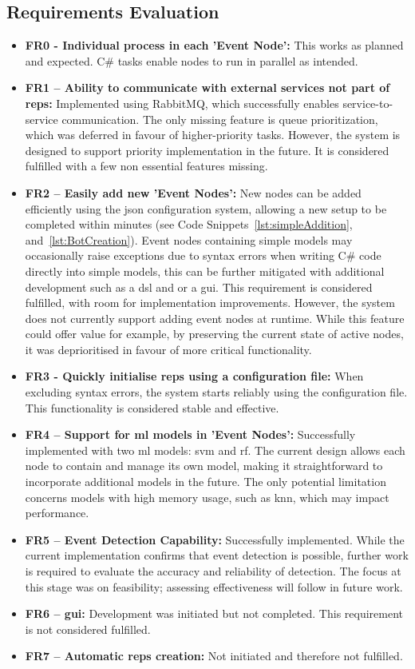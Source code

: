 \documentclass[a4paper,8pt]{article}
\begin{document}
		\subsection{Requirements Evaluation} \label{sec:RecEval}
			\begin{itemize}
				\item \textbf{FR0 - Individual process in each 'Event Node':} This works as planned and expected. C\# tasks enable nodes to run in parallel as intended.
				\item \textbf{FR1 – Ability to communicate with external services not part of \gls{reps}:} Implemented using RabbitMQ, which successfully enables service-to-service communication. The only missing feature is queue prioritization, which was deferred in favour of higher-priority tasks. However, the system is designed to support priority implementation in the future. It is considered fulfilled with a few non essential features missing.
				\item \textbf{FR2 – Easily add new 'Event Nodes':} New nodes can be added efficiently using the \gls{json} configuration system, allowing a new setup to be completed within minutes (see Code Snippets~\ref{lst:simpleAddition}, and~\ref{lst:BotCreation}). Event nodes containing simple models may occasionally raise exceptions due to syntax errors when writing C\# code directly into simple models, this can be further mitigated with additional development such as a \gls{dsl} and or a \gls{gui}. This requirement is considered fulfilled, with room for implementation improvements. However, the system does not currently support adding event nodes at runtime. While this feature could offer value for example, by preserving the current state of active nodes, it was deprioritised in favour of more critical functionality.
				\item \textbf{FR3 - Quickly initialise \gls{reps} using a configuration file:} When excluding syntax errors, the system starts reliably using the configuration file. This functionality is considered stable and effective.
				\item \textbf{FR4 – Support for \gls{ml} models in 'Event Nodes':} Successfully implemented with two \gls{ml} models: \gls{svm} and \gls{rf}. The current design allows each node to contain and manage its own model, making it straightforward to incorporate additional models in the future. The only potential limitation concerns models with high memory usage, such as \gls{knn}, which may impact performance.
				\item \textbf{FR5 – Event Detection Capability:} Successfully implemented. While the current implementation confirms that event detection is possible, further work is required to evaluate the accuracy and reliability of detection. The focus at this stage was on feasibility; assessing effectiveness will follow in future work.
				\item \textbf{FR6 – \gls{gui}:} Development was initiated but not completed. This requirement is not considered fulfilled.
				\item \textbf{FR7 – Automatic \gls{reps} creation:} Not initiated and therefore not fulfilled.
			\end{itemize}
\end{document}
